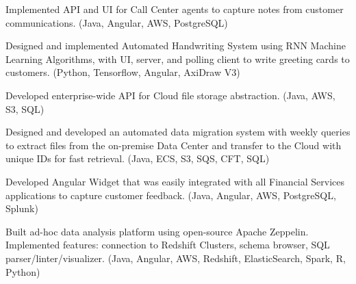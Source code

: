 \documentclass[letterpaper]{deedy-resume} %
\begin{document}
\begin{minipage}[t]{0.7\textwidth}
\sectionsep %


\begin{tightemize}
\item Implemented API and UI for Call Center agents to capture notes from customer communications. (Java, Angular, AWS, PostgreSQL)
\item Designed and implemented Automated Handwriting System using RNN Machine Learning Algorithms, with UI, server, and polling client to write greeting cards to customers. (Python, Tensorflow, Angular, AxiDraw V3)
\item Developed enterprise-wide API for Cloud file storage abstraction. (Java, AWS, S3, SQL)
\item Designed and developed an automated data migration system with weekly queries to extract files from the on-premise Data Center and transfer to the Cloud with unique IDs for fast retrieval. (Java, ECS, S3, SQS, CFT, SQL)
\end{tightemize}

\sectionsep %


\begin{tightemize}
\item Developed Angular Widget that was easily integrated with all Financial Services applications to capture customer feedback. (Java, Angular, AWS, PostgreSQL, Splunk)
\item Built ad-hoc data analysis platform using open-source Apache Zeppelin. Implemented features: connection to Redshift Clusters, schema browser, SQL parser/linter/visualizer. (Java, Angular, AWS, Redshift, ElasticSearch, Spark, R, Python)
\end{tightemize}

\sectionsep %



\end{minipage} %

\end{document}
